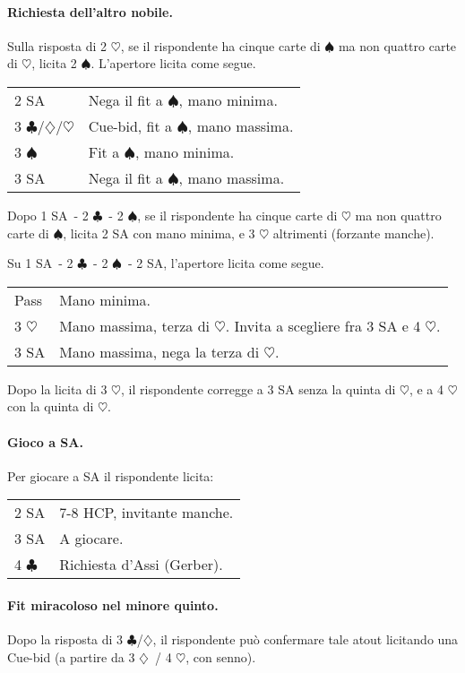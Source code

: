 \documentclass[a4paper,10pt]{article}
\renewcommand{\c}{$\clubsuit$\xspace}
\renewcommand{\d}{$\diamondsuit$\xspace}
\newcommand{\h}{$\heartsuit$\xspace}
\newcommand{\s}{$\spadesuit$\xspace}
\newcommand{\sa}{SA\xspace}
\newcommand{\smallspace}{\vskip0.3cm}
\newenvironment{twocol}
  {\smallspace\noindent\begin{tabular}{l p{0.78\textwidth}}}
  {\end{tabular}\smallspace}
\begin{document}
\paragraph{Richiesta dell'altro nobile.}
Sulla risposta di 2 \h, se il rispondente ha cinque carte di \s ma non quattro carte di \h, licita 2 \s. L'apertore licita come segue.

\begin{twocol}
	2 \sa & Nega il fit a \s, mano minima. \\
	3 \c/\d/\h & Cue-bid, fit a \s, mano massima. \\
	3 \s & Fit a \s, mano minima. \\
	3 \sa & Nega il fit a \s, mano massima.
\end{twocol}

Dopo 1 \sa\ - 2 \c\ - 2 \s, se il rispondente ha cinque carte di \h ma non quattro carte di \s, licita 2 \sa con mano minima, e 3 \h altrimenti (forzante manche).

Su 1 \sa\ - 2 \c\ - 2 \s\ - 2 \sa, l'apertore licita come segue.

\begin{twocol}
	Pass & Mano minima. \\
	3 \h & Mano massima, terza di \h. Invita a scegliere fra 3 \sa e 4 \h. \\
	3 \sa & Mano massima, nega la terza di \h. \\
\end{twocol}

Dopo la licita di 3 \h, il rispondente corregge a 3 \sa senza la quinta di \h, e a 4 \h con la quinta di \h.

\paragraph{Gioco a SA.}
Per giocare a SA il rispondente licita:
\begin{twocol}
	2 \sa & 7-8 HCP, invitante manche. \\
	3 \sa & A giocare. \\
	4 \c & Richiesta d'Assi (Gerber).
\end{twocol}

\paragraph{Fit miracoloso nel minore quinto.}
Dopo la risposta di 3 \c/\d, il rispondente può confermare tale atout licitando una Cue-bid (a partire da 3 \d\ / 4 \h, con senno).
\end{document}
